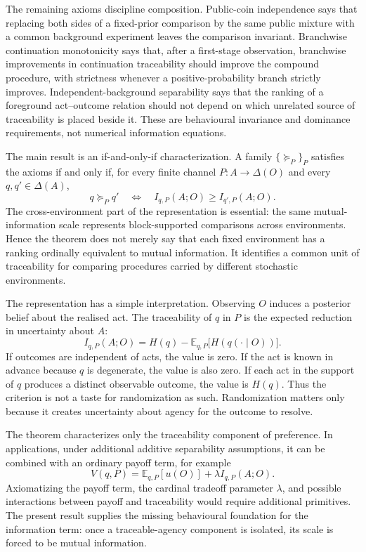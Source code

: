 \documentclass[11pt,a4paper]{article}
\theoremstyle{definition}
\newcommand{\E}{\mathbb E}
\newcommand{\1}{\mathbf 1}
\begin{document}
The remaining axioms discipline composition.  Public-coin independence says that replacing both sides of a fixed-prior
comparison by the same public mixture with a common background experiment leaves the comparison invariant.  Branchwise
continuation monotonicity says that, after a first-stage observation, branchwise improvements in continuation traceability
should improve the compound procedure, with strictness whenever a positive-probability branch strictly improves.
Independent-background separability says that the ranking of a foreground act--outcome relation should not depend on
which unrelated source of traceability is placed beside it.  These are behavioural invariance and dominance requirements,
not numerical information equations.

The main result is an if-and-only-if characterization.  A family $\{\succeq_P\}_P$ satisfies the axioms if and only if,
for every finite channel $P:A\to\Delta(O)$ and every $q,q'\in\Delta(A)$,
\[
q\succeq_P q'
\quad\Longleftrightarrow\quad
I_{q,P}(A;O)\ge I_{q',P}(A;O).
\]
The cross-environment part of the representation is essential: the same mutual-information scale represents
block-supported comparisons across environments.  Hence the theorem does not merely say that each fixed environment has a
ranking ordinally equivalent to mutual information.  It identifies a common unit of traceability for comparing procedures
carried by different stochastic environments.

The representation has a simple interpretation.  Observing $O$ induces a posterior belief about the realised act.  The
traceability of $q$ in $P$ is the expected reduction in uncertainty about $A$:
\[
I_{q,P}(A;O)
=
H(q)-\E_{q,P}\bigl[H(q(\cdot\mid O))\bigr].
\]
If outcomes are independent of acts, the value is zero.  If the act is known in advance because $q$ is degenerate, the
value is also zero.  If each act in the support of $q$ produces a distinct observable outcome, the value is $H(q)$.  Thus
the criterion is not a taste for randomization as such.  Randomization matters only because it creates uncertainty about
agency for the outcome to resolve.

The theorem characterizes only the traceability component of preference.  In applications, under additional additive
separability assumptions, it can be combined with an ordinary payoff term, for example
\[
V(q,P)=\E_{q,P}[u(O)]+\lambda I_{q,P}(A;O).
\]
Axiomatizing the payoff term, the cardinal tradeoff parameter $\lambda$, and possible interactions between payoff and
traceability would require additional primitives.  The present result supplies the missing behavioural foundation for the
information term: once a traceable-agency component is isolated, its scale is forced to be mutual information.
\end{document}
